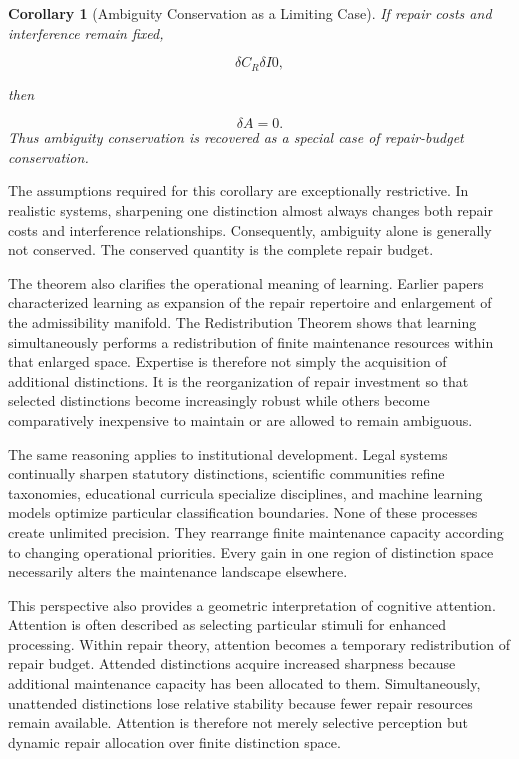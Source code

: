 \documentclass[12pt,oneside]{article}
\theoremstyle{plain}
\newtheorem{corollary}[theorem]{Corollary}
\theoremstyle{definition}
\theoremstyle{remark}
\begin{document}
\begin{corollary}[Ambiguity Conservation as a Limiting Case]
If repair costs and interference remain fixed,

\[
\delta C_R
\delta I

0,
\]

then

\[
\delta A=0.
\]
Thus ambiguity conservation is recovered as a special case of repair-budget conservation.
\end{corollary}

The assumptions required for this corollary are exceptionally restrictive. In realistic systems, sharpening one distinction almost always changes both repair costs and interference relationships. Consequently, ambiguity alone is generally not conserved. The conserved quantity is the complete repair budget.

The theorem also clarifies the operational meaning of learning. Earlier papers characterized learning as expansion of the repair repertoire and enlargement of the admissibility manifold. The Redistribution Theorem shows that learning simultaneously performs a redistribution of finite maintenance resources within that enlarged space. Expertise is therefore not simply the acquisition of additional distinctions. It is the reorganization of repair investment so that selected distinctions become increasingly robust while others become comparatively inexpensive to maintain or are allowed to remain ambiguous.

The same reasoning applies to institutional development. Legal systems continually sharpen statutory distinctions, scientific communities refine taxonomies, educational curricula specialize disciplines, and machine learning models optimize particular classification boundaries. None of these processes create unlimited precision. They rearrange finite maintenance capacity according to changing operational priorities. Every gain in one region of distinction space necessarily alters the maintenance landscape elsewhere.

This perspective also provides a geometric interpretation of cognitive attention. Attention is often described as selecting particular stimuli for enhanced processing. Within repair theory, attention becomes a temporary redistribution of repair budget. Attended distinctions acquire increased sharpness because additional maintenance capacity has been allocated to them. Simultaneously, unattended distinctions lose relative stability because fewer repair resources remain available. Attention is therefore not merely selective perception but dynamic repair allocation over finite distinction space.
\end{document}
